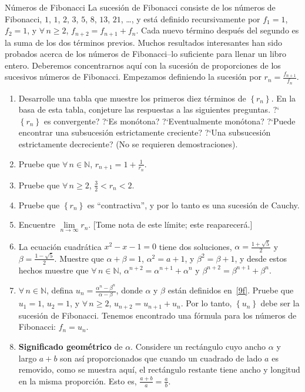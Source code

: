 \begin{solution}
	
\end{solution}

\begin{prob}{Números de Fibonacci}
	La sucesión de Fibonacci consiste de los números de Fibonacci, $1$, $1$, $2$, $3$, $5$, $8$, $13$, $21$, \ldots, y está definido recursivamente por $f_{1}=1$, $f_{2}=1$, y $\forall\,n\geq2$, $f_{n+2}=f_{n+1}+f_{n}$. Cada nuevo término después del segundo es la suma de los dos términos previos. Muchos resultados interesantes han sido probados acerca de los números de Fibonacci--lo suficiente para llenar un libro entero. Deberemos concentrarnos aquí con la sucesión de proporciones de los sucesivos números de Fibonacci. Empezamos definiendo la sucesión por $r_{n}=\tfrac{f_{n+1}}{f_{n}}$.
		\begin{enumerate}
			\item Desarrolle una tabla que muestre los primeros diez términos de $\left\{r_{n}\right\}$. En la basa de esta tabla, conjeture las respuestas a las siguientes preguntas. ?`$\left\{r_{n}\right\}$ es convergente? ?`Es monótona? ?`Eventualmente monótona? ?`Puede encontrar una subsucesión estrictamente creciente? ?`Una subsucesión estrictamente decreciente? (No se requieren demostraciones).
			\item Pruebe que $\forall\,n\in\mathds{N}$, $r_{n+1}=1+\tfrac{1}{r_{n}}$.
			\item Pruebe que $\forall\,n\geq2$, $\tfrac{3}{2}<r_{n}<2$.
			\item Pruebe que $\left\{r_{n}\right\}$ es ``contractiva'', y por lo tanto es una sucesión de Cauchy.
			\item Encuentre $\lim\limits_{n\to\infty}r_{n}$. [Tome nota de este límite; este reaparecerá.]
			\item La ecuación cuadrática $x^{2}-x-1=0$ tiene dos soluciones, $\alpha=\frac{1+\sqrt{5}}{2}$ y $\beta=\frac{1-\sqrt{5}}{2}$. Muestre que $\alpha+\beta=1$, $\alpha^{2}=a+1$, y $\beta^{2}=\beta+1$, y desde estos hechos muestre que $\forall\,n\in\mathbb{N}$, $\alpha^{n+2}=\alpha^{n+1}+\alpha^{n}$ y $\beta^{n+2}=\beta^{n+1}+\beta^{n}$.\label{9f}
			\item $\forall\,n\in\mathds{N}$, defina $u_{n}=\frac{\alpha^{n}-\beta^{n}}{\alpha-\beta}$, donde $\alpha$ y $\beta$ están definidos en~\ref{9f}. Pruebe que $u_{1}=1$, $u_{2}=1$, y $\forall\,n\geq2$, $u_{n+2}=u_{n+1}+u_{n}$. Por lo tanto, $\left\{u_{n}\right\}$ debe ser la sucesión de Fibonacci. Tenemos encontrado una fórmula para los números de Fibonacci: $f_{n}=u_{n}$.
			\item \textbf{Significado geométrico} de $\alpha$. Considere un rectángulo cuyo ancho $\alpha$ y largo $a+b$ son así proporcionados que cuando un cuadrado de lado $a$ es removido, como se muestra aquí, el rectángulo restante tiene ancho y longitud en la misma proporción. Esto es, $\tfrac{a+b}{a}=\tfrac{a}{b}$.
	

\end{enumerate}
\end{prob}
